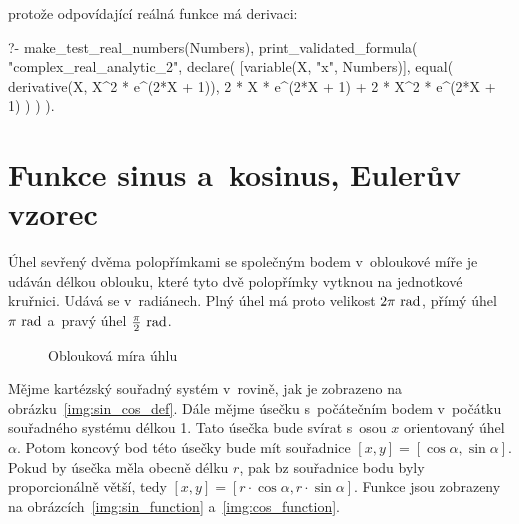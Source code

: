 protože odpovídající reálná funkce má derivaci:

\begin{prolog}
?-	make_test_real_numbers(Numbers),
	print_validated_formula(
		"complex_real_analytic_2",
		declare(	[variable(X, "x", Numbers)],
			equal(
				derivative(X, X^2 * e^(2*X + 1)),
				2 * X * e^(2*X + 1) + 2 * X^2 * e^(2*X + 1)
			)
		)
	).
\end{prolog}

\section{Funkce sinus a~kosinus, Eulerův vzorec}

Úhel sevřený dvěma polopřímkami se společným bodem v~obloukové míře je udáván délkou oblouku, které tyto dvě polopřímky vytknou na jednotkové kruřnici. Udává se v~radiánech. Plný úhel má proto velikost \(2 \pi \ \mathrm{rad}\), přímý úhel \(\pi \ \mathrm{rad}\) a~pravý úhel \(\frac{\pi}{2} \ \mathrm{rad}\).

\begin{figure}[ht]
\begin{center}
\caption{Oblouková míra úhlu}
\label{img:rad_def}
\end{center}
\end{figure}

Mějme kartézský souřadný systém v~rovině, jak je zobrazeno na obrázku~\ref{img:sin_cos_def}. Dále mějme úsečku s~počátečním bodem v~počátku souřadného systému délkou 1. Tato úsečka bude svírat s~osou \(x\) orientovaný úhel \(\alpha\). Potom koncový bod této úsečky bude mít souřadnice \([x, y] = [\cos \alpha, \sin \alpha]\). Pokud by úsečka měla obecně délku \(r\), pak bz souřadnice bodu byly proporcionálně větší, tedy \([x, y] = [r \cdot \cos \alpha, r \cdot \sin \alpha]\). Funkce jsou zobrazeny na obrázcích~\ref{img:sin_function} a~\ref{img:cos_function}.

